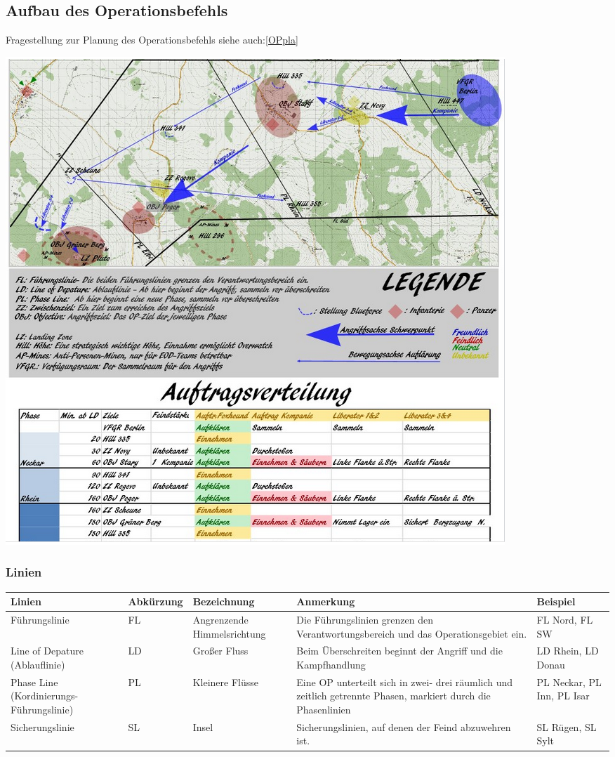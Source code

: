 \newpage

\subsection{Aufbau des Operationsbefehls}
\label{OPbef}
Fragestellung zur Planung des Operationsbefehls siehe auch:\ref{OPpla}

\begin{minipage}[t]{1\textwidth}
	\includegraphics[width=\textwidth]{./Grafiken/KarteUndMarkierungen/OP-Befehl.png}
\end{minipage}

\subsubsection{Linien}
\begin{longtable}{|p{3cm}|p{}|p{}|p{4cm}|p{}|} 																											\hline
	Linien				&		Abkürzung			&		Bezeichnung				&			Anmerkung 									&		Beispiel 			\\ \hline
	Führungslinie			&		FL				&		Angrenzende Himmelsrichtung	&			Die Führungslinien grenzen \newline den Verantwortungsbereich und \newline das Operationsgebiet ein. & FL Nord, FL SW \\ \hline
	Line of Depature (Ablauflinie)&		LD				&		Großer Fluss				&			Beim Überschreiten beginnt der Angriff und die Kampfhandlung 	&	LD Rhein, LD Donau			\\ \hline
	Phase Line (Kordinierungs-Führungslinie) & PL				&		Kleinere Flüsse			&			Eine OP unterteilt sich in zwei- drei räumlich und zeitlich getrennte Phasen, markiert durch die Phasenlinien	& PL Neckar, PL Inn, PL Isar	\\ \hline
	Sicherungslinie 		&		SL 				&		Insel					&			Sicherungslinien, auf denen der Feind abzuwehren ist.		&	SL Rügen, SL Sylt			\\ \hline
\end{longtable}

